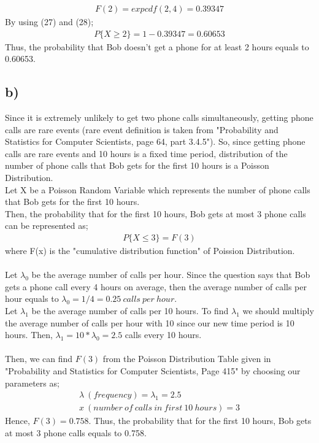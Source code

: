 \documentclass[12pt]{article}
\begin{document}
\begin{equation} 
\begin{split}
F(2) = expcdf(2,4) = 0.39347
\end{split}
\end{equation}
By using (27) and (28);
\begin{equation*} 
\begin{split}
P\{X \geq 2\} = 1 - 0.39347 = 0.60653
\end{split}
\end{equation*}
Thus, the probability that Bob doesn't get a phone for at least 2 hours equals to 0.60653.

\subsection*{b)} Since it is extremely unlikely to get two phone calls simultaneously, getting phone calls are rare events (rare event definition is taken from "Probability and Statistics for Computer Scientists, page 64, part 3.4.5"). So, since getting phone calls are rare events and 10 hours is a fixed time period, distribution of the number of phone calls that Bob gets for the first 10 hours is a Poisson Distribution.\\
Let X be a Poisson Random Variable which represents the number of phone calls that Bob gets for the first 10 hours. \\
Then, the probability that for the first 10 hours, Bob gets at most 3 phone calls can be represented as;
\begin{equation*} 
\begin{split}
P\{X \leq 3\} = F(3)
\end{split}
\end{equation*}
where F(x) is the "cumulative distribution function" of Poission Distribution. \\ \\
Let $\lambda_{0}$ be the average number of calls per hour. Since the question says that Bob gets a phone call every 4 hours on average, then the average number of calls per hour equals to $\lambda_{0} = 1/4 = 0.25\ calls\ per\ hour$. \\
Let $\lambda_{1}$ be the average number of calls per 10 hours. To find $\lambda_{1}$ we should multiply the average number of calls per hour with 10 since our new time period is 10 hours. Then, $\lambda_{1} = 10*\lambda_{0} = 2.5$ calls every 10 hours. \\ \\
Then, we can find $F(3)$ from the Poisson Distribution Table given in "Probability and Statistics for Computer Scientists, Page 415" by choosing our parameters as;
\begin{equation*} 
\begin{split}
\lambda \ (frequency) = \lambda_{1} = 2.5 \\
x \ (number\ of\ calls\ in\ first\ 10\ hours ) = 3
\end{split}
\end{equation*}
Hence, $F(3) = 0.758$. Thus, the probability that for the first 10 hours, Bob gets at most 3 phone calls equals to 
0.758.
\end{document}
